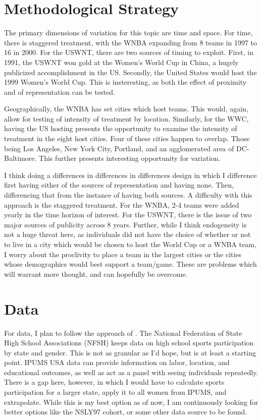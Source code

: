 \documentclass[11pt]{article}
\newcommand{\Section}[1]{\section{#1}}
\newcommand{\1}[1]{\mathbb{I}\{#1\}}
\theoremstyle{plain}
\begin{document}
\Section{Methodological Strategy}
  The primary dimensions of variation for this topic are time and space. For time, there is staggered treatment, with the WNBA expanding from 8 teams
  in 1997 to 16 in 2000. For the USWNT, there are two sources of timing to exploit. First, in 1991, the USWNT won gold at the Women's World Cup in China,
  a hugely publicized accomplishment in the US. Secondly, the United States would host the 1999 Women's World Cup. This is insteresting, as both the effect
  of proximity and of representation can be tested.

  Geographically, the WNBA has set cities which host teams. This would, again, allow for testing of intensity of treatment by location. Similarly, for the WWC,
  having the US hosting presents the opportunity to examine the intensity of treatment in the eight host cities. Four of these cities happen to overlap. Those being
  Los Angeles, New York City, Portland, and an agglomerated area of DC-Baltimore. This further presents interesting opportunity for variation.

  I think doing a differences in differences in differences design in which I difference first having either of the sources of representation and having none. Then,
  differencing that from the instance of having both sources. A difficulty with this approach is the staggered treatment. For the WNBA, 2-4 teams were added yearly in
  the time horizon of interest. For the USWNT, there is the issue of two major sources of publicity across 8 years. Further, while I think endogeneity is not a huge
  threat here, as individuals did not have the choice of whether or not to live in a city which would be chosen to host the World Cup or a WNBA team, I worry about the
  proclivity to place a team in the largest cities or the cities whose demographics would best support a team/game. These are problems which will warrant more thought,
  and can hopefully be overcome.

\Section{Data}
  For data, I plan to follow the approach of \cite{stevenson_beyond_nodate}. The National Federation of State High School Associations (NFSH) keeps data on high school sports 
  participation by state and gender. This is not as granular as I'd hope, but is at least a starting point. IPUMS USA data can provide information on labor, location, and educational outcomes,
  as well as act as a panel with seeing individuals repeatedly. There is a gap here, however, in which I would have to calculate sports participation for a larger state, apply it to all
  women from IPUMS, and extrapolate. While this is my best option as of now, I am continuously looking for better options like the NSLY97 cohort, or some other data source to be found.
\end{document}
